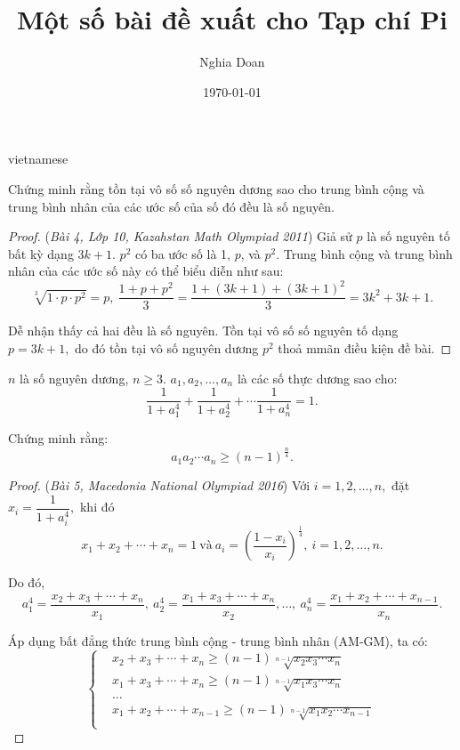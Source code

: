 \documentclass{article}
\title{Một số bài đề xuất cho Tạp chí Pi}
\author{Nghia Doan}
\date{\today}
\begin{document}
\begin{otherlanguage*}{vietnamese}

\maketitle

\begin{example*}[Bài 1]
    Chứng minh rằng tồn tại vô số số nguyên dương sao cho trung bình cộng và trung bình nhân của các ước số của số đó đều là số nguyên.
\end{example*}

\begin{proof} (\textit{Bài 4, Lớp 10, Kazahstan Math Olympiad 2011})
    Giả sử $p$ là số nguyên tố bất kỳ dạng $3k+1.$ $p^2$ có ba ước số là 1, $p$, và $p^2.$
    Trung bình cộng và trung bình nhân của các ước số này có thể biểu diễn như sau:
    \[
        \sqrt[3]{1 \cdot p \cdot p^2} = p,\ \frac{1+p+p^2}{3} = \frac{1 + (3k+1) + (3k+1)^2}{3} = 3k^2 + 3k + 1.
    \]

    Dễ nhận thấy cả hai đều là số nguyên. Tồn tại vô số số nguyên tố dạng $p=3k+1,$ do đó tồn tại vô số nguyên dương $p^2$ thoả mmãn điều kiện đề bài.
\end{proof}

\newpage

\begin{example*}[Bài 2]
    $n$ là số nguyên dương, $n \ge 3.$ $a_1, a_2, \ldots, a_n$ là các số thực dương sao cho:
    \[
        \frac{1}{1+a_1^4} + \frac{1}{1+a_2^4} + \cdots \frac{1}{1+a_n^4} = 1.
    \]

    Chứng minh rằng:
    \[
        a_1 a_2 \cdots a_n \ge (n-1)^{\frac{n}{4}}.
    \]
\end{example*}

\begin{proof} (\textit{Bài 5, Macedonia National Olympiad 2016})
    Với $i=1,2, \ldots, n,$ đặt $x_i = \dfrac{1}{1+a_i^4},$ khi đó
    \[
        x_1 + x_2 + \cdots + x_n = 1\ \text{và}\  a_i = \left( \frac{1-x_i}{x_i} \right)^{\frac{1}{4}},\ i=1,2, \ldots, n.
    \]

    Do đó,
    \[
        a_1^4 = \frac{x_2 + x_3 + \cdots + x_n}{x_1},\ a_2^4= \frac{x_1 + x_3 + \cdots + x_n}{x_2}, \ldots,\ a_n^4= \frac{x_1 + x_2 + \cdots + x_{n-1}}{x_n}.
    \]

    Áp dụng bất đẳng thức trung bình cộng - trung bình nhân (AM-GM), ta có:
    \[
        \begin{cases}
            &x_2 + x_3 + \cdots + x_n \ge (n-1)\sqrt[n-1]{x_2x_3 \cdots x_n}\\
            &x_1 + x_3 + \cdots + x_n \ge (n-1)\sqrt[n-1]{x_1x_3 \cdots x_n}\\
            &\ldots\\
            &x_1 + x_2 + \cdots + x_{n-1} \ge (n-1)\sqrt[n-1]{x_1x_2 \cdots x_{n-1}}\\
        \end{cases}
    \]


\end{proof}
\end{otherlanguage*}
\end{document}
